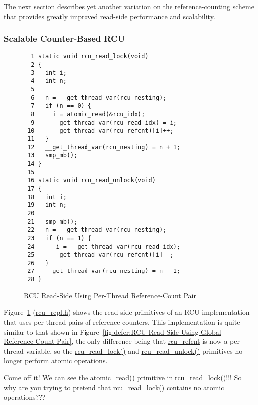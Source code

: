 The next section describes yet another variation on the reference-counting
scheme that provides greatly improved read-side performance and scalability.

\subsubsection{Scalable Counter-Based RCU}
\label{defer:Scalable Counter-Based RCU}

\begin{figure}[tbp]
{ \scriptsize
\begin{verbatim}
  1 static void rcu_read_lock(void)
  2 {
  3   int i;
  4   int n;
  5 
  6   n = __get_thread_var(rcu_nesting);
  7   if (n == 0) {
  8     i = atomic_read(&rcu_idx);
  9     __get_thread_var(rcu_read_idx) = i;
 10     __get_thread_var(rcu_refcnt)[i]++;
 11   }
 12   __get_thread_var(rcu_nesting) = n + 1;
 13   smp_mb();
 14 }
 15 
 16 static void rcu_read_unlock(void)
 17 {
 18   int i;
 19   int n;
 20 
 21   smp_mb();
 22   n = __get_thread_var(rcu_nesting);
 23   if (n == 1) {
 24      i = __get_thread_var(rcu_read_idx);
 25     __get_thread_var(rcu_refcnt)[i]--;
 26   }
 27   __get_thread_var(rcu_nesting) = n - 1;
 28 }
\end{verbatim}
}
\caption{RCU Read-Side Using Per-Thread Reference-Count Pair}
\label{fig:defer:RCU Read-Side Using Per-Thread Reference-Count Pair}
\end{figure}

Figure~\ref{fig:defer:RCU Read-Side Using Per-Thread Reference-Count Pair}
(\url{rcu_rcpl.h})
shows the read-side primitives of an RCU implementation that uses per-thread
pairs of reference counters.
This implementation is quite similar to that shown in
Figure~\ref{fig:defer:RCU Read-Side Using Global Reference-Count Pair},
the only difference being that \url{rcu_refcnt} is now a per-thread
variable, so the \url{rcu_read_lock()} and
\url{rcu_read_unlock()} primitives no longer perform atomic operations.

\QuickQuiz{}
	Come off it!
	We can see the \url{atomic_read()} primitive in
	\url{rcu_read_lock()}!!!
	So why are you trying to pretend that \url{rcu_read_lock()}
	contains no atomic operations???
 \QuickQuizEnd

